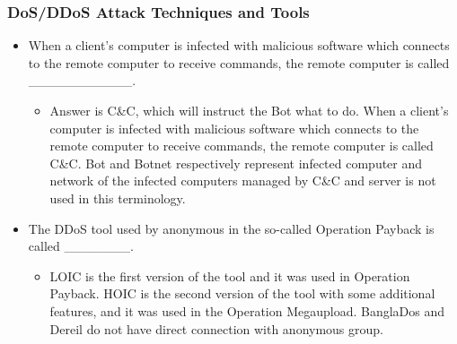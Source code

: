 \subsubsection{DoS/DDoS Attack Techniques and Tools}
\begin{itemize}
    \item When a client's computer is infected with malicious software which connects to the remote computer to receive commands, the remote computer is called \_\_\_\_\_\_\_\_\_\_\_.
    \begin{itemize}
        \item Answer is C\&C, which will instruct the Bot what to do. When a client's computer is infected with malicious software which connects to the remote computer to receive commands, the remote computer is called C\&C. Bot and Botnet respectively represent infected computer and network of the infected computers managed by C\&C and server is not used in this terminology.
    \end{itemize}
    \item The DDoS tool used by anonymous in the so-called Operation Payback is called \_\_\_\_\_\_\_.
    \begin{itemize}
        \item LOIC is the first version of the tool and it was used in Operation Payback. HOIC is the second version of the tool with some additional features, and it was used in the Operation Megaupload. BanglaDos and Dereil do not have direct connection with anonymous group.
    \end{itemize}
\end{itemize}
